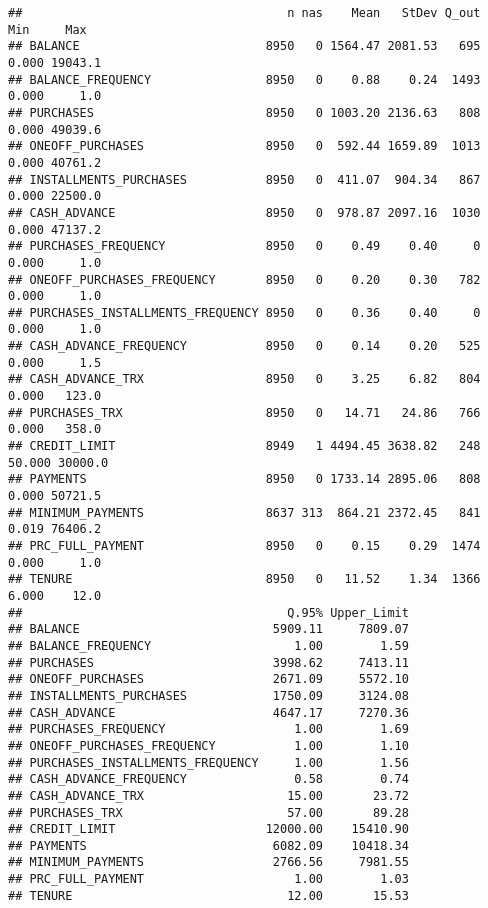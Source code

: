 \documentclass[11pt,]{article}
\begin{document}
\begin{verbatim}
##                                     n nas    Mean   StDev Q_out    Min     Max
## BALANCE                          8950   0 1564.47 2081.53   695  0.000 19043.1
## BALANCE_FREQUENCY                8950   0    0.88    0.24  1493  0.000     1.0
## PURCHASES                        8950   0 1003.20 2136.63   808  0.000 49039.6
## ONEOFF_PURCHASES                 8950   0  592.44 1659.89  1013  0.000 40761.2
## INSTALLMENTS_PURCHASES           8950   0  411.07  904.34   867  0.000 22500.0
## CASH_ADVANCE                     8950   0  978.87 2097.16  1030  0.000 47137.2
## PURCHASES_FREQUENCY              8950   0    0.49    0.40     0  0.000     1.0
## ONEOFF_PURCHASES_FREQUENCY       8950   0    0.20    0.30   782  0.000     1.0
## PURCHASES_INSTALLMENTS_FREQUENCY 8950   0    0.36    0.40     0  0.000     1.0
## CASH_ADVANCE_FREQUENCY           8950   0    0.14    0.20   525  0.000     1.5
## CASH_ADVANCE_TRX                 8950   0    3.25    6.82   804  0.000   123.0
## PURCHASES_TRX                    8950   0   14.71   24.86   766  0.000   358.0
## CREDIT_LIMIT                     8949   1 4494.45 3638.82   248 50.000 30000.0
## PAYMENTS                         8950   0 1733.14 2895.06   808  0.000 50721.5
## MINIMUM_PAYMENTS                 8637 313  864.21 2372.45   841  0.019 76406.2
## PRC_FULL_PAYMENT                 8950   0    0.15    0.29  1474  0.000     1.0
## TENURE                           8950   0   11.52    1.34  1366  6.000    12.0
##                                     Q.95% Upper_Limit
## BALANCE                           5909.11     7809.07
## BALANCE_FREQUENCY                    1.00        1.59
## PURCHASES                         3998.62     7413.11
## ONEOFF_PURCHASES                  2671.09     5572.10
## INSTALLMENTS_PURCHASES            1750.09     3124.08
## CASH_ADVANCE                      4647.17     7270.36
## PURCHASES_FREQUENCY                  1.00        1.69
## ONEOFF_PURCHASES_FREQUENCY           1.00        1.10
## PURCHASES_INSTALLMENTS_FREQUENCY     1.00        1.56
## CASH_ADVANCE_FREQUENCY               0.58        0.74
## CASH_ADVANCE_TRX                    15.00       23.72
## PURCHASES_TRX                       57.00       89.28
## CREDIT_LIMIT                     12000.00    15410.90
## PAYMENTS                          6082.09    10418.34
## MINIMUM_PAYMENTS                  2766.56     7981.55
## PRC_FULL_PAYMENT                     1.00        1.03
## TENURE                              12.00       15.53
\end{verbatim}
\end{document}
